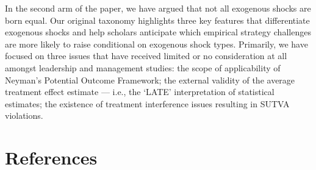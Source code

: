 \documentclass[11pt]{article}
\begin{document}
\begin{refsection}
In the second arm of the paper, we have argued that not all exogenous shocks are
born equal. Our original taxonomy highlights three key features that 
differentiate exogenous shocks and help scholars anticipate which empirical 
strategy challenges are more likely to raise conditional on exogenous shock
types. Primarily, we have focused on three issues that have received limited or
no consideration at all amongst leadership and management studies: the scope of
applicability of Neyman's Potential Outcome Framework; the external validity of
the average treatment effect estimate --- i.e., the `LATE'
interpretation of statistical estimates; the existence of treatment interference
issues resulting in SUTVA violations.


%
\section*{References}
\printbibliography[heading=none]
\end{refsection}
\end{document}
